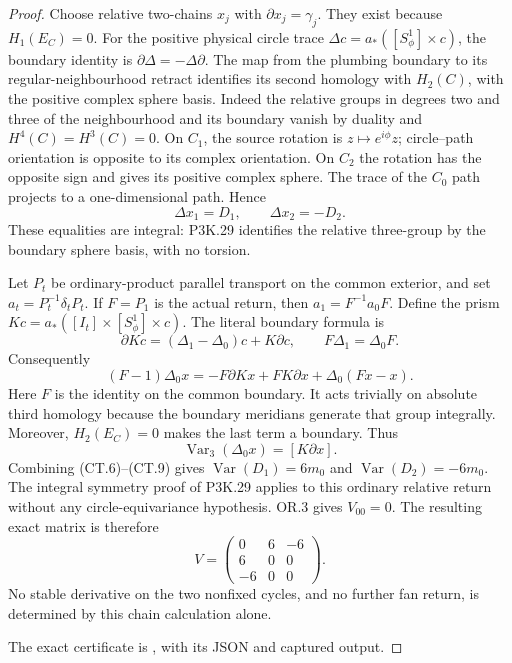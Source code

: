 \begin{proof}
Choose relative two-chains \(x_j\) with \(\partial x_j=\gamma_j\).
They exist because \(H_1(E_C)=0\). For the positive physical circle
trace \(\Delta c=a_*([S^1_\phi]\times c)\), the boundary identity
is \(\partial\Delta=-\Delta\partial\). The map from the plumbing
boundary to its regular-neighbourhood retract identifies its second
homology with \(H_2(C)\), with the positive complex sphere basis.
Indeed the relative groups in degrees two and three of the
neighbourhood and its boundary vanish by duality and
\(H^4(C)=H^3(C)=0\). On \(C_1\), the source rotation is
\(z\mapsto e^{i\phi}z\); circle--path orientation is opposite to
its complex orientation. On \(C_2\) the rotation has the opposite
sign and gives its positive complex sphere. The trace of the
\(C_0\) path projects to a one-dimensional path. Hence
\[
             \Delta x_1=D_1,\qquad
             \Delta x_2=-D_2.                         \tag{CT.7}
\]
These equalities are integral: P3K.29 identifies the relative
three-group by the boundary sphere basis, with no torsion.

Let \(P_t\) be ordinary-product parallel transport on the common
exterior, and set \(a_t=P_t^{-1}\delta_tP_t\). If \(F=P_1\) is
the actual return, then \(a_1=F^{-1}a_0F\). Define the prism
\(Kc=a_*([I_t]\times[S^1_\phi]\times c)\). The literal boundary
formula is
\[
 \partial Kc=(\Delta_1-\Delta_0)c+K\partial c,
          \qquad F\Delta_1=\Delta_0F.                 \tag{CT.8}
\]
Consequently
\[
 (F-1)\Delta_0x
 =-F\partial Kx+F K\partial x+\Delta_0(Fx-x).
\]
Here \(F\) is the identity on the common boundary. It acts trivially
on absolute third homology because the boundary meridians generate
that group integrally. Moreover,
\(H_2(E_C)=0\) makes the last term a boundary. Thus
\[
             \operatorname{Var}_3(\Delta_0x)
                           =[K\partial x].            \tag{CT.9}
\]
Combining (CT.6)--(CT.9) gives
\(\operatorname{Var}(D_1)=6m_0\) and
\(\operatorname{Var}(D_2)=-6m_0\). The integral symmetry proof
of P3K.29 applies to this ordinary relative return without any
circle-equivariance hypothesis. OR.3 gives \(V_{00}=0\).
The resulting exact matrix is therefore
\[
 V=\begin{pmatrix}0&6&-6\\6&0&0\\-6&0&0\end{pmatrix}. \tag{CT.10}
\]
No stable derivative on the two nonfixed cycles, and no further fan
return, is determined by this chain calculation alone.

The exact certificate is , with its JSON and captured output.
\end{proof}
